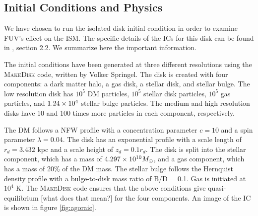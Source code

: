 \subsection{Initial Conditions and Physics}
\label{sec:initialconditions}

We have chosen to run the isolated disk initial condition in order to examine FUV's effect on the ISM. The specific details of the ICs for this disk can be found in \citet{kimEt14}, section 2.2. We summarize here the important information.

The initial conditions have been generated at three different resolutions using the \textsc{MakeDisk} code, written by Volker Springel. The disk is created with four components: a dark matter halo, a gas disk, a stellar disk, and stellar bulge. The low resolution disk has $10^5$ DM particles, $10^5$ stellar disk particles, $10^5$ gas particles, and $1.24\times 10^{4}$ stellar bulge particles. The medium and high resolution disks have 10 and 100 times more particles in each component, respectively.

The DM follows a NFW profile \citep{navarroEt97} with a concentration parameter $c = 10$ and a spin parameter $\lambda = 0.04$. The disk has an exponential profile with a scale length of $r_d = 3.432$ kpc and a scale height of $z_d = 0.1 r_d$. The disk is split into the stellar component, which has a mass of $4.297\times 10^{10} M_{\odot}$, and a gas component, which has a mass of 20\% of the DM mass. The stellar bulge follows the Hernquist \citeyear{hernquist90} density profile with a bulge-to-disk mass ratio of B/D = 0.1. Gas is initiated at $10^4$ K. The \textsc{MakeDisk} code ensures that the above conditions give quasi-equilibrium [what does that mean?] for the four components. An image of the IC is shown in figure \ref{fig:agoraic}.

